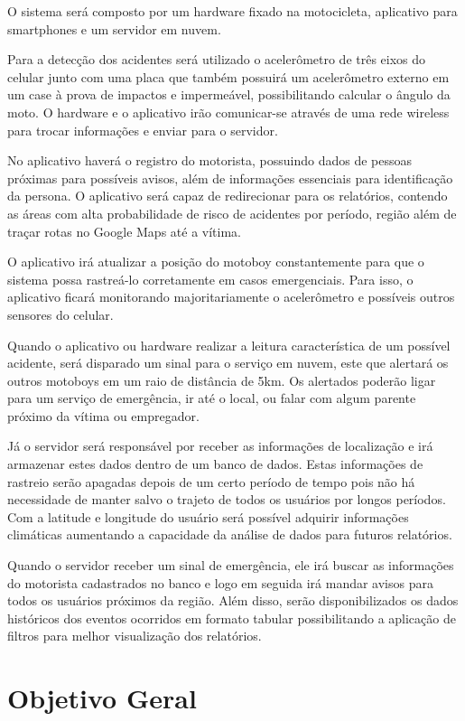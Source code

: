 O sistema será composto por um hardware fixado na motocicleta, aplicativo para smartphones e um servidor em nuvem.

Para a detecção dos acidentes será utilizado o acelerômetro de três eixos do celular junto com uma placa que também possuirá um acelerômetro externo em um case à prova de impactos e impermeável, possibilitando calcular o ângulo da moto. O hardware e o aplicativo irão comunicar-se através de uma rede wireless para trocar informações e enviar para o servidor.

No aplicativo haverá o registro do motorista, possuindo dados de pessoas próximas para possíveis avisos, além de informações essenciais para identificação da persona. O aplicativo será capaz de redirecionar para os relatórios, contendo as áreas com alta probabilidade de risco de acidentes por período, região além de traçar rotas no Google Maps até a vítima.

O aplicativo irá atualizar a posição do motoboy constantemente para que o sistema possa rastreá-lo corretamente em casos emergenciais. Para isso, o aplicativo ficará monitorando majoritariamente o acelerômetro e possíveis outros sensores do celular.

Quando o aplicativo ou hardware realizar a leitura característica de um possível acidente, será disparado um sinal para o serviço em nuvem, este que alertará os outros motoboys em um raio de distância de 5km. Os alertados poderão ligar para um serviço de emergência, ir até o local, ou falar com algum parente próximo da vítima ou empregador.

Já o servidor será responsável por receber as informações de localização e irá armazenar estes dados dentro de um banco de dados. Estas informações de rastreio serão apagadas depois de um certo período de tempo pois não há necessidade de manter salvo o trajeto de todos os usuários por longos períodos. Com a latitude e longitude do usuário será possível adquirir informações climáticas aumentando a capacidade da análise de dados para futuros relatórios.

Quando o servidor receber um sinal de emergência, ele irá buscar as informações do motorista cadastrados no banco e logo em seguida irá mandar avisos para todos os usuários próximos da região.
Além disso, serão disponibilizados os dados históricos dos eventos ocorridos em formato tabular possibilitando a aplicação de filtros para melhor visualização dos relatórios.



\clearpage
\section{Objetivo Geral}


